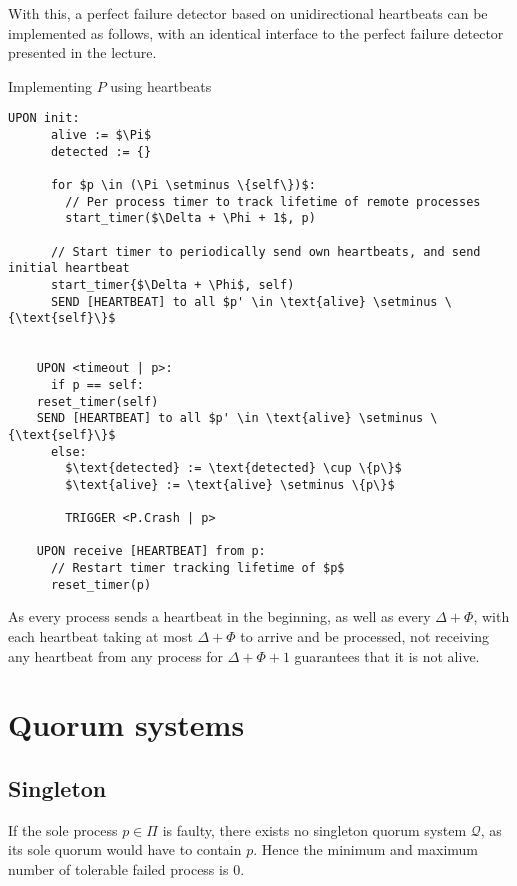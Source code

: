 \documentclass[a4paper]{scrreprt}
\begin{document}
With this, a perfect failure detector based on unidirectional heartbeats can be
implemented as follows, with an identical interface to the perfect failure
detector presented in the lecture.

\begin{library}{Implementing $P$ using heartbeats}
  \begin{lstlisting}[mathescape=true,autogobble=true,breaklines=true]
    UPON init:
      alive := $\Pi$
      detected := {}

      for $p \in (\Pi \setminus \{self\})$:
        // Per process timer to track lifetime of remote processes
        start_timer($\Delta + \Phi + 1$, p)

      // Start timer to periodically send own heartbeats, and send initial heartbeat
      start_timer{$\Delta + \Phi$, self)
      SEND [HEARTBEAT] to all $p' \in \text{alive} \setminus \{\text{self}\}$
      

    UPON <timeout | p>:
      if p == self:
	reset_timer(self)
	SEND [HEARTBEAT] to all $p' \in \text{alive} \setminus \{\text{self}\}$
      else:
        $\text{detected} := \text{detected} \cup \{p\}$
        $\text{alive} := \text{alive} \setminus \{p\}$

        TRIGGER <P.Crash | p>

    UPON receive [HEARTBEAT] from p:
      // Restart timer tracking lifetime of $p$
      reset_timer(p)
  \end{lstlisting}
\end{library}

As every process sends a heartbeat in the beginning, as well as every $\Delta +
\Phi$, with each heartbeat taking at most $\Delta + \Phi$ to arrive and be
processed, not receiving any heartbeat from any process for $\Delta + \Phi + 1$
guarantees that it is not alive.

\section{Quorum systems}

\subsection{Singleton}

If the sole process $p \in \Pi$ is faulty, there exists no singleton quorum
system $\mathcal{Q}$, as its sole quorum would have to contain $p$. Hence the
minimum and maximum number of tolerable failed process is $0$.
\end{document}
